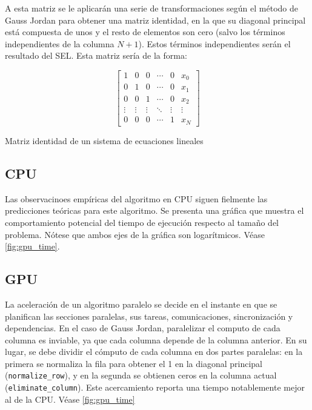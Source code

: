 A esta matriz se le aplicarán una serie de transformaciones según el método
de Gauss Jordan para obtener una matriz identidad,
en la que su diagonal principal está compuesta de unos y el resto de elementos
son cero (salvo los términos independientes de la columna $N+1$).
Estos términos independientes serán el resultado del SEL.
Esta matriz sería de la forma:

\begin{mycapequ}[h]
\begin{equation}
    \begin{bmatrix}
        1 & 0 & 0 & \cdots & 0 & x_0 \\
        0 & 1 & 0 & \cdots & 0 & x_1 \\
        0 & 0 & 1 & \cdots & 0 & x_2 \\
        \vdots & \vdots & \vdots & \ddots & \vdots & \vdots \\
        0 & 0 & 0 & \cdots & 1 & x_N
    \end{bmatrix}
\end{equation}
\caption{Matriz identidad de un sistema de ecuaciones lineales}
\label{eq:sel_identity}
\end{mycapequ}

\subsection{CPU}

Las observacinoes empíricas del algoritmo en CPU siguen fielmente
las predicciones teóricas para este algoritmo.
Se presenta una gráfica que muestra el comportamiento potencial
del tiempo de ejecución respecto al tamaño del problema.
Nótese que ambos ejes de la gráfica son logarítmicos.
Véase \autoref{fig:gpu_time}.

\subsection{GPU}

La aceleración de un algoritmo paralelo se decide
en el instante en que se planifican las secciones paralelas,
sus tareas, comunicaciones, sincronización y dependencias.
En el caso de Gauss Jordan, paralelizar el computo
de cada columna es inviable, ya que cada columna
depende de la columna anterior.
En su lugar, se debe dividir el cómputo de cada columna
en dos partes paralelas: en la primera se normaliza la fila
para obtener el 1 en la diagonal principal
(\texttt{normalize\_row}),
y en la segunda se obtienen ceros en la columna actual
(\texttt{eliminate\_column}).
Este acercamiento reporta una tiempo notablemente mejor
al de la CPU. Véase \autoref{fig:gpu_time}


